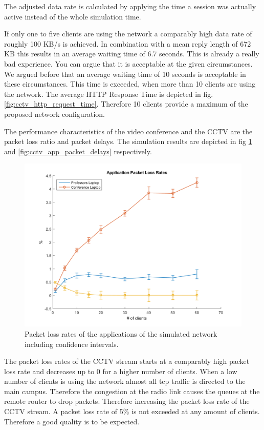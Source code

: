 \documentclass[
10pt, %
a4paper, %
oneside, %
headinclude,footinclude, %
BCOR5mm, %
]{scrartcl}
\begin{document}
The adjusted data rate is calculated by applying the time a session was actually active instead of the whole simulation time. 

If only one to five clients are using the network a comparably high data rate of roughly 100 KB/s is achieved. In combination with a mean reply length of 672 KB this results in an average waiting time of 6.7 seconds. This is already a really bad experience. You can argue that it is acceptable at the given circumstances. We argued before that an average waiting time of 10 seconds is acceptable in these circumstances. This time is exceeded, when more than 10 clients are using the network. The average HTTP Response Time is depicted in fig. \ref{fig:cctv_http_request_time}. Therefore 10 clients provide a maximum of the proposed network configuration.

The performance characteristics of the video conference and the CCTV are the packet loss ratio and packet delays. The simulation results are depicted in fig \ref{fig:cctv_app_packet_loss_rates} and \ref{fig:cctv_app_packet_delays} respectively.
\begin{figure}[!ht]
  \centering
  \includegraphics[width=\textwidth]{Figures/cctv/Application_Packet_Loss_Rates.png}
  \caption{Packet loss rates of the applications of the simulated network including confidence intervals.} \label{fig:cctv_app_packet_loss_rates}
\end{figure}

The packet loss rates of the CCTV stream starts at a comparably high packet loss rate and decreases up to 0 for a higher number of clients. When a low number of clients is using the network almost all tcp traffic is directed to the main campus. Therefore the congestion at the radio link causes the queues at the remote router to drop packets. Therefore increasing the packet loss rate of the CCTV stream. A packet loss rate of 5\% is not exceeded at any amount of clients. Therefore a good quality is to be expected.
\end{document}
